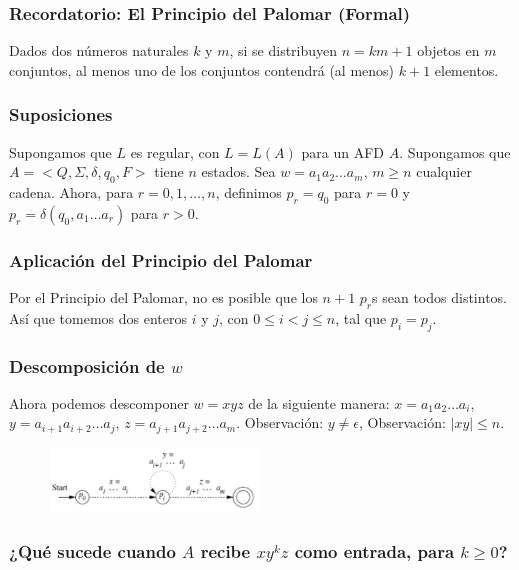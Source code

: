 \documentclass[11pt]{article}
\begin{document}
    \subsubsection{Recordatorio: El Principio del Palomar (Formal)}

    Dados dos números naturales $k$ y $m$, si se distribuyen $n = km + 1$ objetos en $m$ conjuntos, al menos uno de los conjuntos contendrá (al menos) $k + 1$ elementos.

    \subsubsection{Suposiciones}

    Supongamos que $L$ es regular, con $L = L(A)$ para un AFD $A$. Supongamos que $A = < Q, \Sigma, \delta, q_0, F>$ tiene $n$ estados. Sea $w = a_1a_2 \ldots a_m$, $m \geq n$ cualquier cadena. Ahora, para $r = 0, 1, \ldots, n$, definimos $p_r = q_0$ para $r = 0$ y $p_r = \delta(q_0, a_1 \ldots a_r)$ para $r > 0$.

    \subsubsection{Aplicación del Principio del Palomar}

    Por el Principio del Palomar, no es posible que los $n + 1$ $p_r$s sean todos distintos. Así que tomemos dos enteros $i$ y $j$, con $0 \leq i < j \leq n$, tal que $p_i = p_j$.

    \subsubsection{Descomposición de $w$}

    Ahora podemos descomponer $w = xyz$ de la siguiente manera: $x = a_1a_2 \ldots a_i$, $y = a_{i+1}a_{i+2} \ldots a_j$, $z = a_{j+1}a_{j+2} \ldots a_m$. Observación: $y \neq \epsilon$, Observación: $|xy| \leq n$.

    \begin{figure}[H]
        \centering
        \includegraphics[width=0.5\textwidth]{img/afd/afd-11}\label{fig:figure11}
    \end{figure}

    \subsubsection{¿Qué sucede cuando $A$ recibe $xy^kz$ como entrada, para $k \geq 0$?}
\end{document}

